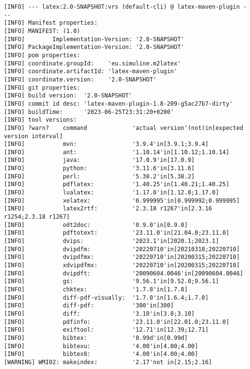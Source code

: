 \begin{lstlisting}[basicstyle=\tiny,
float, captionpos=b, label={lst:vrsOut}, 
caption={Output of goal \texttt{latex:vrs}}]
[INFO] --- latex:2.0-SNAPSHOT:vrs (default-cli) @ latex-maven-plugin ---
[INFO] Manifest properties: 
[INFO] MANIFEST: (1.0)
[INFO]        Implementation-Version: '2.0-SNAPSHOT'
[INFO] PackageImplementation-Version: '2.0-SNAPSHOT'
[INFO] pom properties:
[INFO] coordinate.groupId:    'eu.simuline.m2latex'
[INFO] coordinate.artifactId: 'latex-maven-plugin'
[INFO] coordinate.version:    '2.0-SNAPSHOT'
[INFO] git properties: 
[INFO] build version:  '2.0-SNAPSHOT'
[INFO] commit id desc: 'latex-maven-plugin-1.8-209-g5ac27b7-dirty'
[INFO] buildTime:      '2023-06-25T23:31:20+0200'
[INFO] tool versions: 
[INFO] ?warn?    command             'actual version'(not)in[expected version interval]
[INFO]           mvn:                '3.9.4'in[3.9.1;3.9.4]
[INFO]           ant:                '1.10.14'in[1.10.12;1.10.14]
[INFO]           java:               '17.0.9'in[17.0.9]
[INFO]           python:             '3.11.6'in[3.11.6]
[INFO]           perl:               '5.38.2'in[5.38.2]
[INFO]           pdflatex:           '1.40.25'in[1.40.21;1.40.25]
[INFO]           lualatex:           '1.17.0'in[1.12.0;1.17.0]
[INFO]           xelatex:            '0.999995'in[0.999992;0.999995]
[INFO]           latex2rtf:          '2.3.18 r1267'in[2.3.16 r1254;2.3.18 r1267]
[INFO]           odt2doc:            '0.9.0'in[0.9.0]
[INFO]           pdftotext:          '23.11.0'in[21.04.0;23.11.0]
[INFO]           dvips:              '2023.1'in[2020.1;2023.1]
[INFO]           dvipdfm:            '20220710'in[20210318;20220710]
[INFO]           dvipdfmx:           '20220710'in[20200315;20220710]
[INFO]           xdvipdfmx:          '20220710'in[20200315;20220710]
[INFO]           dvipdft:            '20090604.0046'in[20090604.0046]
[INFO]           gs:                 '9.56.1'in[9.52.0;9.56.1]
[INFO]           chktex:             '1.7.8'in[1.7.8]
[INFO]           diff-pdf-visually:  '1.7.0'in[1.6.4;1.7.0]
[INFO]           diff-pdf:           '300'in[300]
[INFO]           diff:               '3.10'in[3.8;3.10]
[INFO]           pdfinfo:            '23.11.0'in[22.01.0;23.11.0]
[INFO]           exiftool:           '12.71'in[12.39;12.71]
[INFO]           bibtex:             '0.99d'in[0.99d]
[INFO]           bibtexu:            '4.00'in[4.00;4.00]
[INFO]           bibtex8:            '4.00'in[4.00;4.00]
[WARNING] WMI02: makeindex:          '2.17'not in[2.15;2.16]

\end{lstlisting}
